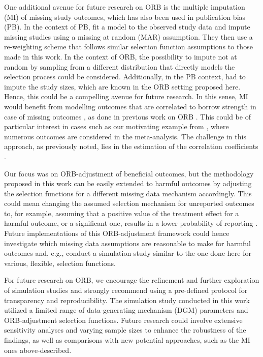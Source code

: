 \documentclass[twocolumn]{article}\usepackage[]{graphicx}\usepackage[]{xcolor}
\begin{document}
One additional avenue for future research on ORB is the multiple imputation (MI) of missing study outcomes, which has also been used in publication bias (PB). In the context of PB, \citet{MI_PB_Carpenter2011} fit a model to the observed study data and impute missing studies using a missing at random (MAR) assumption. They then use a re-weighting scheme that follows similar selection function assumptions to those made in this work. In the context of ORB, the possibility to impute not at random by sampling from a different distribution that directly models the selection process could be considered. Additionally, in the PB context, \citet{MI_PB_Carpenter2011} had to impute the study sizes,  which are known in the ORB setting proposed here. Hence, this could be a compelling avenue for future research. In this sense, MI would benefit from modelling outcomes that are correlated to borrow strength in case of missing outcomes \citep{MI_PB_Carpenter2011}, as done in previous work on ORB \citep{Bay, Kirkham2012}. This could be of particular interest in cases such as our motivating example from \citet{Copas2019, topiramate}, where numerous outcomes are considered in the meta-analysis. The challenge in this approach, as previously noted, lies in the estimation of the correlation coefficients \citep{mythesis, Bay, Kirkham2012}.

Our focus was on ORB-adjustment of beneficial outcomes, but the methodology proposed in this work can be easily extended to harmful outcomes by adjusting the selection functions for a different missing data mechanism accordingly. This could mean changing the assumed selection mechanism for unreported outcomes to, for example, assuming that a positive value of the treatment effect for a harmful outcome, or a significant one, results in a lower probability of reporting \citep{Copas2019, Copas2014, ORBIT_paper}. Future implementations of this ORB-adjustment framework could hence investigate which missing data assumptions are reasonable to make for harmful outcomes and, e.g., conduct a simulation study similar to the one done here for various, flexible, selection functions.

For future research on ORB, we encourage the refinement and further exploration of simulation studies and strongly recommend using a pre-defined protocol for transparency and reproducibility. The simulation study conducted in this work utilized a limited range of data-generating mechanism (DGM) parameters and ORB-adjustment selection functions. Future research could involve extensive sensitivity analyses and varying sample sizes to enhance the robustness of the findings, as well as comparisons with new potential approaches, such as the MI ones above-described.
\end{document}
